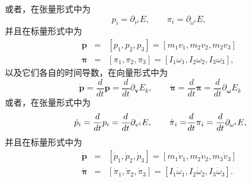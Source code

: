 \documentclass[11pt,fontset=founder]{ctexart}
\begin{document}
或者，在张量形式中为
\begin{equation*}
p_{i}=\partial _{v^{i}}E{,\qquad }\pi _{i}=\partial _{{\omega }^{i}}E,
\end{equation*}
并且在标量形式中为
\begin{eqnarray*}
\mathbf{p} &=&[p_{1},p_{2},p_{3}]=[m_{1}v_{1},m_{2}v_{2},m_{2}v_{3}] \\
\mathbf{\pi } &=&[\pi _{1},\pi _{2},\pi _{3}]=[I_{1}\omega _{1},I_{2}\omega
_{2},I_{3}\omega _{3}],
\end{eqnarray*}
以及它们各自的时间导数，在向量形式中为
\begin{equation*}
~\boldsymbol{\dot{\mathbf{p}}}=\frac{d}{dt}\mathbf{p=}\frac{d}{{dt}}\partial _{\mathbf{v}%
}E_{k}{,\qquad \boldsymbol{\dot{\pi}}=}\frac{d}{dt}\mathbf{\pi =}{\frac{d}{{dt}}}%
\partial _{\mathbf{\omega }}E_{k}
\end{equation*}
或者，在张量形式中为
\begin{equation*}
~\dot{p}_{i}=\frac{d}{dt}p_{i}=\frac{d}{dt}\partial _{v^{i}}E{,\qquad \dot{%
\pi}_{i}=}\frac{d}{dt}\pi _{i}=\frac{d}{dt}\partial _{{\omega }^{i}}E,
\end{equation*}
并且在标量形式中为
\begin{eqnarray*}
\boldsymbol{\dot{\mathbf{p}}} &=&[\dot{p}_{1},\dot{p}_{2},\dot{p}_{3}]=[m_{1}\dot{v}%
_{1},m_{2}\dot{v}_{2},m_{3}\dot{v}_{3}] \\
{\boldsymbol{\dot{\pi}}} &=&[\dot{\pi}_{1},\dot{\pi}_{2},\dot{\pi}_{3}]=[I_{1}%
\dot{\omega}_{1},I_{2}\dot{\omega}_{2},I_{3}\dot{\omega}_{3}].
\end{eqnarray*}
\end{document}
